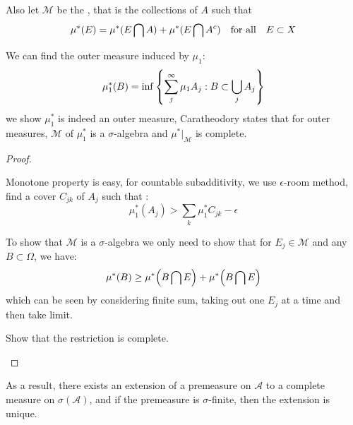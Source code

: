 Also let \(\mathcal{M}\) be the , that is the collections of \(A\) such that 
\begin{equation*}
    \mu^{*} (E) = \mu^{*}(E\cap A) + \mu^{*} (E\cap A^{c}) \qq{for all} E \subset X
\end{equation*}

\begin{thm}
    We can find the outer measure induced by \(\mu_{1}\): 
    \begin{equation*}
        \mu^{*}_{1}(B) = \inf\Bqty{\sum^{\infty}_{j} \mu_{1} A_{j}: B \subset \cup_{j}A_{j}}
    \end{equation*}
    we show \(\mu^{*}_{1}\) is indeed an outer measure, Caratheodory states that for outer measures, \(\mathcal{M}\) of \(\mu^{*}_{1}\) is a \(\sigma\)-algebra and \(\mu^{*}|_{\mathcal{M}}\) is complete. 
\end{thm}
\begin{proof}
    \begin{summary}[1]
        Monotone property is easy, for countable subadditivity, we use \(\epsilon\)-room method, find a cover \(C_{jk}\) of \(A_{j}\) such that :
        \begin{equation*}
            \mu^{*}_{1}(A_{j}) > \sum_{k} \mu^{*}_{1}C_{jk} - \epsilon
        \end{equation*}
    \end{summary}
    \begin{summary}[2]
        To show that \(\mathcal{M}\) is a \(\sigma\)-algebra we only need to show that for \(E_{j} \in \mathcal{M}\) and any \(B \subset \Omega\), we have:
        \begin{equation*}
            \mu^{*} (B ) \geq \mu^{*} \pqty{B \cap E} + \mu^{*} \pqty{B \cap E}
        \end{equation*}
        which can be seen by considering finite sum, taking out one \(E_{j}\) at a time and then take limit. 
    \end{summary}
    \begin{summary}[3]
        Show that the restriction is complete.
    \end{summary}
\end{proof}

\begin{remark}
    As a result, there exists an extension of a premeasure on \(\mathcal{A}\) to a complete measure on \(\sigma(\mathcal{A})\), and if the premeasure is \(\sigma\)-finite, then the extension is unique. 
\end{remark}

